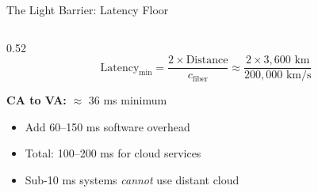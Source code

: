 \documentclass[aspectratio=169, 12pt]{beamer}
\begin{document}
\begin{frame}{The Light Barrier: Latency Floor}
\note{
%
%
%
%
}

\small
\begin{columns}[T]
  \begin{column}{0.52\textwidth}
    $$\text{Latency}_{\min} = \frac{2 \times \text{Distance}}{c_{\text{fiber}}} \approx \frac{2 \times 3{,}600 \text{ km}}{200{,}000 \text{ km/s}}$$

    \vspace{0.15cm}
    \textbf{CA to VA:} $\approx$ \alert{36 ms minimum}

    \vspace{0.15cm}
    {\footnotesize
    \begin{itemize}\setlength\itemsep{1pt}
      \item Add 60--150 ms software overhead
      \item Total: 100--200 ms for cloud services
      \item Sub-10 ms systems \emph{cannot} use distant cloud
    \end{itemize}
    }


\end{column}
\end{columns}
\end{frame}
\end{document}
